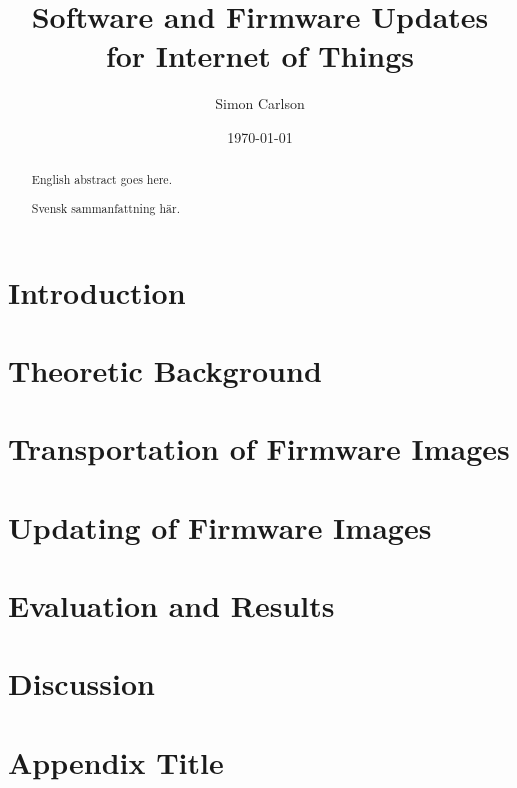\documentclass{kththesis}
\title{Software and Firmware Updates for Internet of Things}
\author{Simon Carlson}
\date{\today}
\begin{document}
\frontmatter

\titlepage

\begin{abstract}
  English abstract goes here.

  
\end{abstract}


\begin{otherlanguage}{swedish}
  \begin{abstract}
    Svensk sammanfattning här.
  \end{abstract}
\end{otherlanguage}


\tableofcontents


\mainmatter


\chapter{Introduction}



\chapter{Theoretic Background}


\chapter{Transportation of Firmware Images}

\chapter{Updating of Firmware Images}

\chapter{Evaluation and Results}


\chapter{Discussion}


\printbibliography[heading=bibintoc] %

\appendix

\chapter{Appendix Title}
\end{document}
